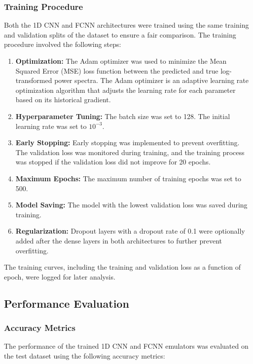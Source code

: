 \documentclass[twocolumn]{aastex631}
\begin{document}
\subsubsection{Training Procedure}

Both the 1D CNN and FCNN architectures were trained using the same training and validation splits of the dataset to ensure a fair comparison. The training procedure involved the following steps:

\begin{enumerate}
    \item \textbf{Optimization:} The Adam optimizer was used to minimize the Mean Squared Error (MSE) loss function between the predicted and true log-transformed power spectra. The Adam optimizer is an adaptive learning rate optimization algorithm that adjusts the learning rate for each parameter based on its historical gradient.
    \item \textbf{Hyperparameter Tuning:} The batch size was set to 128. The initial learning rate was set to $10^{-3}$.
    \item \textbf{Early Stopping:} Early stopping was implemented to prevent overfitting. The validation loss was monitored during training, and the training process was stopped if the validation loss did not improve for 20 epochs.
    \item \textbf{Maximum Epochs:} The maximum number of training epochs was set to 500.
    \item \textbf{Model Saving:} The model with the lowest validation loss was saved during training.
    \item \textbf{Regularization:} Dropout layers with a dropout rate of 0.1 were optionally added after the dense layers in both architectures to further prevent overfitting.
\end{enumerate}

The training curves, including the training and validation loss as a function of epoch, were logged for later analysis.

\subsection{Performance Evaluation}

\subsubsection{Accuracy Metrics}

The performance of the trained 1D CNN and FCNN emulators was evaluated on the test dataset using the following accuracy metrics:
\end{document}
